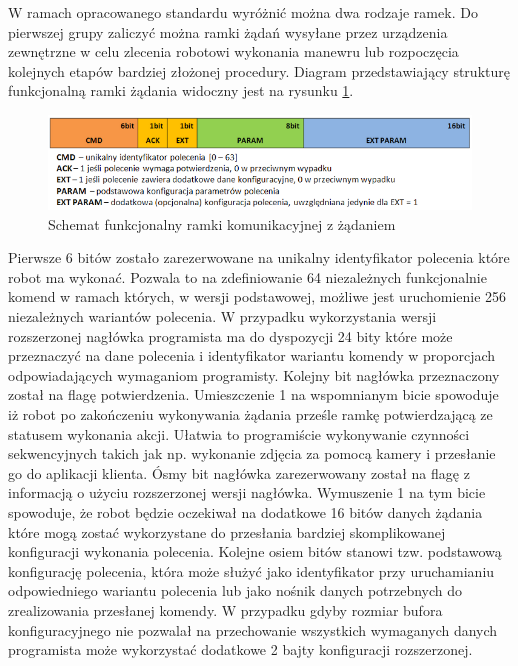 W ramach opracowanego standardu wyróżnić można dwa rodzaje ramek. Do pierwszej grupy
zaliczyć można ramki żądań wysyłane przez urządzenia zewnętrzne w celu zlecenia
robotowi wykonania manewru lub rozpoczęcia kolejnych etapów bardziej złożonej
procedury. Diagram przedstawiający strukturę funkcjonalną ramki żądania widoczny
jest na rysunku \ref{fig:RfcommReqFrame}.

\begin{figure}[h!] 
 \centering
 \includegraphics[width=\textwidth]{../images/ch05/req_schema2.png}
 \caption{Schemat funkcjonalny ramki komunikacyjnej z żądaniem}
 \label{fig:RfcommReqFrame}
\end{figure}

Pierwsze 6 bitów zostało zarezerwowane na unikalny identyfikator polecenia które
robot ma wykonać. Pozwala to na zdefiniowanie 64 niezależnych funkcjonalnie
komend w ramach których, w wersji podstawowej, możliwe jest uruchomienie 256
niezależnych wariantów polecenia. W przypadku wykorzystania wersji rozszerzonej
nagłówka programista ma do dyspozycji 24 bity które może przeznaczyć na dane
polecenia i identyfikator wariantu komendy w proporcjach odpowiadających
wymaganiom programisty. Kolejny bit nagłówka przeznaczony został na flagę potwierdzenia.
Umieszczenie 1 na wspomnianym bicie spowoduje iż robot po zakończeniu
wykonywania żądania prześle ramkę potwierdzającą ze statusem wykonania akcji.
Ułatwia to programiście wykonywanie czynności sekwencyjnych takich jak np. wykonanie
zdjęcia za pomocą kamery i przesłanie go do aplikacji klienta. Ósmy bit nagłówka
zarezerwowany został na flagę z informacją o użyciu rozszerzonej wersji
nagłówka. Wymuszenie 1 na tym bicie spowoduje, że robot będzie oczekiwał na
dodatkowe 16 bitów danych żądania które mogą zostać wykorzystane do przesłania
bardziej skomplikowanej konfiguracji wykonania polecenia. Kolejne osiem bitów
stanowi tzw. podstawową konfigurację polecenia, która może służyć jako
identyfikator przy uruchamianiu odpowiedniego wariantu polecenia lub jako nośnik
danych potrzebnych do zrealizowania przesłanej komendy. W przypadku gdyby
rozmiar bufora konfiguracyjnego nie pozwalał na przechowanie wszystkich
wymaganych danych programista może wykorzystać dodatkowe 2 bajty konfiguracji
rozszerzonej.

